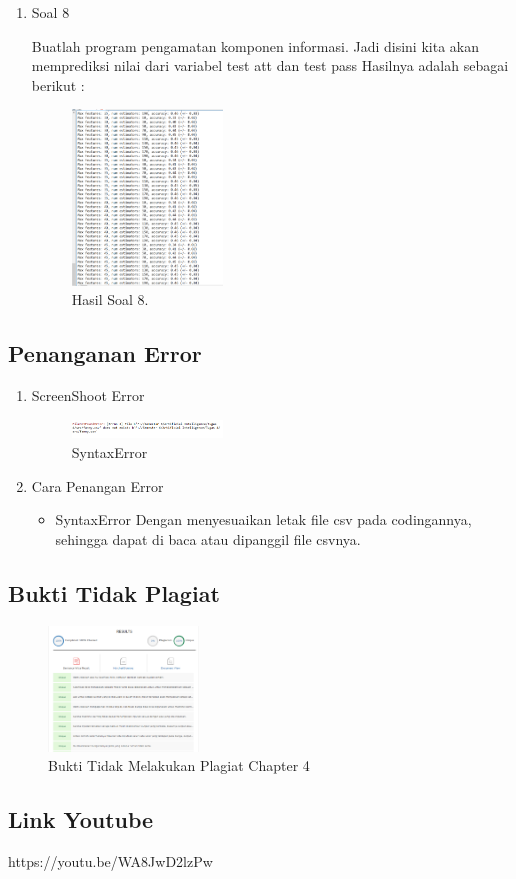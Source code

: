 \begin{enumerate}
	\item Soal 8
	\hfill\break
	
	Buatlah program pengamatan komponen informasi. Jadi disini kita akan memprediksi nilai dari variabel test att dan test pass Hasilnya adalah sebagai berikut :
	\begin{figure}[H]
	\centering
		\includegraphics[width=4cm]{figures/1174071/4/materi/hasil8.PNG}
		\caption{Hasil Soal 8.}
	\end{figure}
\end{enumerate}

\subsection{Penanganan Error}
\begin{enumerate}
	\item ScreenShoot Error
	\begin{figure}[H]
		\includegraphics[width=4cm]{figures/1174071/4/error/1.PNG}
		\centering
		\caption{SyntaxError}
	\end{figure}
	\item Cara Penangan Error
	\begin{itemize}
		\item SyntaxError
		\hfill\break
		Dengan menyesuaikan letak file csv pada codingannya, sehingga dapat  di baca atau dipanggil file csvnya.
	\end{itemize}
\end{enumerate}

\subsection{Bukti Tidak Plagiat}
\begin{figure}[H]
\centering
	\includegraphics[width=4cm]{figures/1174071/4/buktiplagiat/1.PNG}
	\caption{Bukti Tidak Melakukan Plagiat Chapter 4}
\end{figure}

\subsection{Link Youtube}
https://youtu.be/WA8JwD2lzPw

